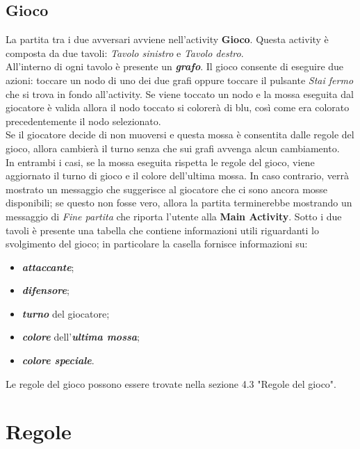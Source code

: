 \documentclass[a4paper,11pt,twoside,openright]{report}
\begin{document}
\subsection{Gioco}
La partita tra i due avversari avviene nell'activity \textbf{Gioco}. Questa activity è composta da due tavoli: \textit{Tavolo sinistro} e \textit{Tavolo destro}.\\
All'interno di ogni tavolo è presente un \textbf{\textit{grafo}}. Il gioco consente di eseguire due azioni: toccare un nodo di uno dei due grafi oppure toccare il pulsante \textit{Stai fermo} che si trova
in fondo all'activity. Se viene toccato un nodo e la mossa eseguita dal giocatore è valida allora il nodo toccato si colorerà di blu, così come era colorato precedentemente il nodo selezionato.\\
Se il giocatore decide di non muoversi e questa mossa è consentita dalle regole del gioco, allora cambierà il turno senza che sui grafi avvenga alcun cambiamento.\\
In entrambi i casi, se la mossa eseguita rispetta le regole del gioco, viene aggiornato il turno di gioco e il colore dell'ultima mossa. In caso contrario, verrà mostrato un messaggio che suggerisce
al giocatore che ci sono ancora mosse disponibili; se questo non fosse vero, allora la partita terminerebbe mostrando un messaggio di \textit{Fine partita} che riporta l'utente alla \textbf{Main Activity}.
Sotto i due tavoli è presente una tabella che contiene informazioni utili riguardanti lo svolgimento del gioco; in particolare la casella fornisce informazioni su:

\begin{itemize}
\item \textbf\textit{attaccante};

\item \textbf\textit{difensore};

\item \textbf\textit{turno} del giocatore;

\item \textbf\textit{colore} dell'\textbf\textit{ultima mossa};

\item \textbf\textit{colore speciale}.
\end{itemize}

 Le regole del gioco possono essere trovate nella sezione 4.3 "Regole del gioco".

\section{Regole}
\end{document}
